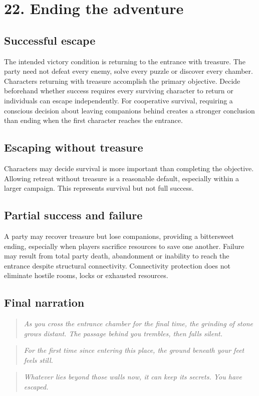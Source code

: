 \section{22. Ending the adventure}

\subsection{Successful escape}

The intended victory condition is returning to the entrance with treasure. The party need not defeat every enemy, solve every puzzle or discover every chamber. Characters returning with treasure accomplish the primary objective. Decide beforehand whether success requires every surviving character to return or individuals can escape independently. For cooperative survival, requiring a conscious decision about leaving companions behind creates a stronger conclusion than ending when the first character reaches the entrance.

\subsection{Escaping without treasure}

Characters may decide survival is more important than completing the objective. Allowing retreat without treasure is a reasonable default, especially within a larger campaign. This represents survival but not full success.

\subsection{Partial success and failure}

A party may recover treasure but lose companions, providing a bittersweet ending, especially when players sacrifice resources to save one another. Failure may result from total party death, abandonment or inability to reach the entrance despite structural connectivity. Connectivity protection does not eliminate hostile rooms, locks or exhausted resources.

\subsection{Final narration}

\begin{quote}\itshape As you cross the entrance chamber for the final time, the grinding of stone grows distant. The passage behind you trembles, then falls silent.\end{quote}

\begin{quote}\itshape For the first time since entering this place, the ground beneath your feet feels still.\end{quote}

\begin{quote}\itshape Whatever lies beyond those walls now, it can keep its secrets. You have escaped.\end{quote}
